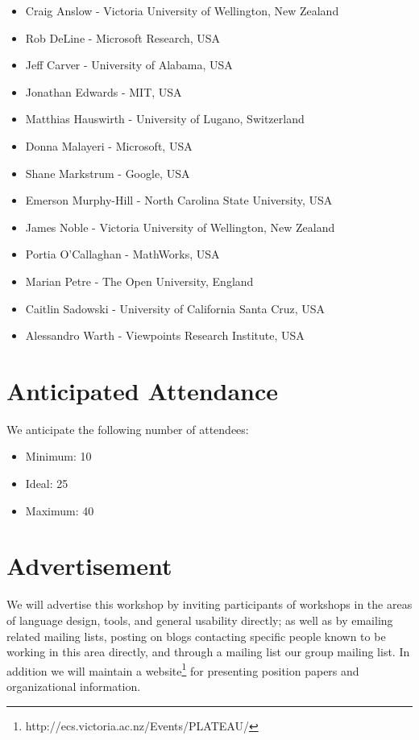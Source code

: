 \documentclass[authorpermission]{sigplanconf}
\begin{document}
\begin{itemize}
\item  Craig Anslow - Victoria University of Wellington, New Zealand
\item  Rob DeLine - Microsoft Research, USA
\item Jeff Carver - University of Alabama, USA
\item Jonathan Edwards - MIT, USA
\item Matthias Hauswirth - University of Lugano, Switzerland
\item Donna Malayeri - Microsoft, USA
\item Shane Markstrum - Google, USA
\item  Emerson Murphy-Hill - North Carolina State University, USA
\item James Noble - Victoria University of Wellington, New Zealand
\item Portia O'Callaghan - MathWorks, USA
\item Marian Petre - The Open University, England
\item Caitlin Sadowski - University of California Santa Cruz, USA
\item  Alessandro Warth - Viewpoints Research Institute, USA 
\end{itemize}


\section{Anticipated Attendance}

We anticipate the following number of attendees:

\begin{itemize}
\item Minimum: 10 
\item Ideal: 25
\item Maximum: 40 
\end{itemize}

\section{Advertisement}

We will advertise this workshop by inviting participants of workshops
in the areas of language design, tools, and general usability
directly; as well as by emailing related mailing lists, posting on
blogs contacting specific people known to be working in this area directly,
and through a mailing list our group mailing list. In addition we will maintain a website\footnote{http://ecs.victoria.ac.nz/Events/PLATEAU/} for presenting position papers and organizational information.
\end{document}
